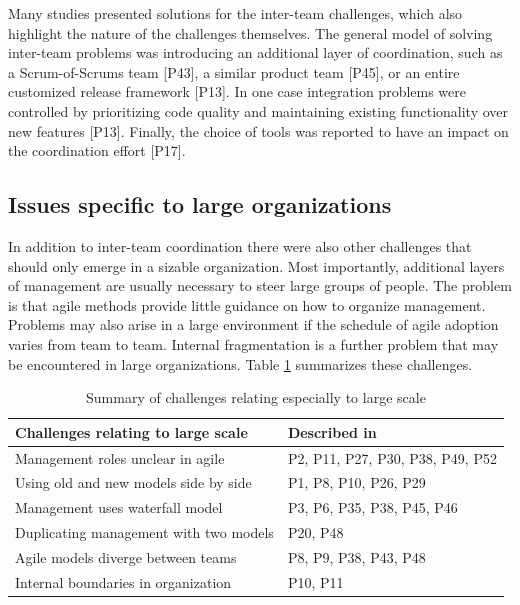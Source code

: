 Many studies presented solutions for the inter-team challenges, which also
highlight the nature of the challenges themselves. The general model of solving
inter-team problems was introducing an additional layer of coordination, such as
a Scrum-of-Scrums team [P43], a similar product team [P45], or an entire
customized release framework [P13]. In one case integration problems were
controlled by prioritizing code quality and maintaining existing functionality
over new features [P13]. Finally, the choice of tools was reported to have an
impact on the coordination effort [P17].



\subsection{Issues specific to large organizations}

In addition to inter-team coordination there were also other challenges that
should only emerge in a sizable organization.
Most importantly, additional layers of management are usually necessary to steer
large groups of people. The problem is that agile methods provide little
guidance on how to organize management.
Problems may also arise in a large environment if the schedule of agile adoption
varies from team to team. Internal fragmentation is a further problem that may
be encountered in large organizations.
Table \ref{table:challenges_largescale} summarizes these challenges.

\begin{table}[h]
    \centering
    \begin{tabular}{ >{\raggedright\arraybackslash}p{}
                     >{\raggedright\arraybackslash}p{} }
        \toprule
        Challenges relating to large scale  &  Described in \\
        \midrule
        Management roles unclear in agile       &  P2, P11, P27, P30, P38, P49, P52 \\
        Using old and new models side by side   &  P1, P8, P10, P26, P29 \\
        Management uses waterfall model         &  P3, P6, P35, P38, P45, P46 \\
        Duplicating management with two models  &  P20, P48 \\
        Agile models diverge between teams      &  P8, P9, P38, P43, P48 \\
        Internal boundaries in organization     &  P10, P11 \\
        \bottomrule
    \end{tabular}
    \caption{Summary of challenges relating especially to large scale}
    \label{table:challenges_largescale}
\end{table}

